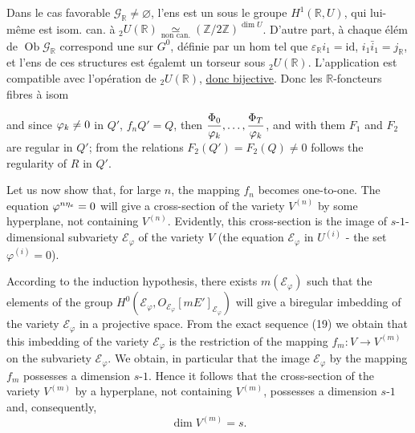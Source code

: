 Dans le cas favorable $\mathscr G_{\mathbb R}\ne\varnothing$,  l'ens   est un   sous le groupe $H^1(\mathbb R,U)$, qui lui-même est isom. can. à ${}_2U(\mathbb R)\underset{\text{non can.}}{\simeq}(\mathbb Z/2\mathbb Z)^{\dim U}$. D'autre part, à chaque élém de $\operatorname{Ob}\mathscr G_{\mathbb R}$ correspond une   sur $G^0$, définie par un hom
tel que $\varepsilon_{\mathbb R}i_1=\mathrm{id}$, $i_1\bar i_1=j_{\mathbb R}$, et l'ens de ces structures est égalemt un torseur sous ${}_2U(\mathbb R)$. L'application
est compatible avec l'opération de ${}_2U(\mathbb R)$, \uline{donc bijective}. Donc les $\mathbb R$-foncteurs fibres à isom

and since ${\varphi_k}\ne0$ in $Q'$, $f_nQ'=Q$, then $\dfrac{{\Phi_0}}{{\varphi_k}},\ldots,\dfrac{{\Phi_T}}{{\varphi_k}}$, and with them $F_1$ and $F_2$ are regular in $Q'$; from the relations $F_2(Q')=F_2(Q)\ne0$ follows the regularity of $R$ in $Q'$.

Let us now show that, for large $n$, the mapping $f_n$ becomes one-to-one. The equation ${\varphi^{n\eta_e}}=0$ will give a cross-section of the variety $V^{(n)}$ by some hyperplane, not containing $V^{(n)}$. Evidently, this cross-section is the image of $s$-$1$-dimensional subvariety $\mathcal E_\varphi$ of the variety $V$ (the equation $\mathcal E_\varphi$ in $U^{(i)}$ - the set $\varphi^{(i)}=0$).

According to the induction hypothesis, there exists $m(\mathcal E_\varphi)$ such that the elements of the group  $H^0(\mathcal E_\varphi,O_{\mathcal E_\varphi}[mE']_{\mathcal E_\varphi})$ will give a biregular imbedding of the variety $\mathcal E_\varphi$ in a projective space. From the exact sequence (19) we obtain that this imbedding of the variety $\mathcal E_\varphi$ is the restriction of the mapping $f_m:V\to V^{(m)}$ on the subvariety $\mathcal E_\varphi$. We obtain, in particular that the image $\mathcal E_\varphi$ by the mapping $f_m$ possesses a dimension $s$-$1$. Hence it follows that the cross-section of the variety $V^{(m)}$ by a hyperplane, not containing $V^{(m)}$, possesses a dimension $s$-$1$ and, consequently,
\[
\dim V^{(m)}=s.
\]

